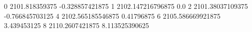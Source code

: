 0 2101.818359375 -0.328857421875
1 2102.147216796875 0.0
2 2101.38037109375 -0.766845703125
4 2102.565185546875 0.41796875
6 2105.586669921875 3.439453125
8 2110.2607421875 8.113525390625

